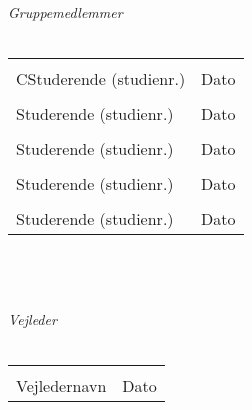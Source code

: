 \begin{vplace}[0.6]
{\large \textit{Gruppemedlemmer}}
\\
\\

\noindent \begin{tabular}{ll}
	\makebox[3.0in]{\hrulefill} & \makebox[1.5in]{\hrulefill}\\
	CStuderende (studienr.) & Dato\\[8ex]%
	\makebox[3in]{\hrulefill} & \makebox[1.5in]{\hrulefill}\\
	Studerende (studienr.) & Dato\\[8ex]
	\makebox[3in]{\hrulefill} & \makebox[1.5in]{\hrulefill}\\
	Studerende (studienr.) & Dato\\[8ex]
	\makebox[3in]{\hrulefill} & \makebox[1.5in]{\hrulefill}\\
	Studerende (studienr.) & Dato\\[8ex]
	\makebox[3in]{\hrulefill} & \makebox[1.5in]{\hrulefill}\\
	Studerende (studienr.) & Dato\\[8ex]
\end{tabular}
\\
\\
\\
{\large \textit{Vejleder}}
\\
\\

\noindent \begin{tabular}{ll}
	\makebox[3.0in]{\hrulefill} & \makebox[1.5in]{\hrulefill}\\
	Vejledernavn & Dato\\[8ex]
\end{tabular}
\end{vplace}

